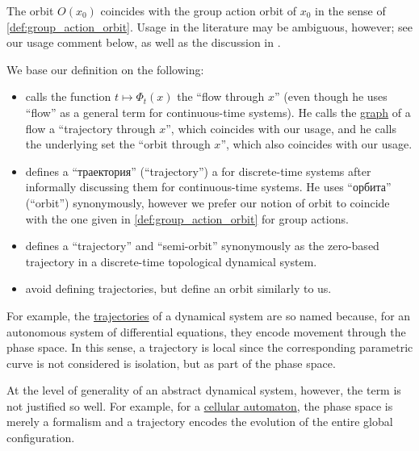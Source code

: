 \begin{comments}
  \item The orbit \( O(x_0) \) coincides with the group action orbit of \( x_0 \) in the sense of \cref{def:group_action_orbit}. Usage in the literature may be ambiguous, however; see our usage comment below, as well as the discussion in \cite{MathSE:orbit_and_trajectory_in_dynamical_system}.

  \item We base our definition on the following:
  \begin{itemize}
    \item {} calls the function \( t \mapsto \Phi_t(x) \) the \enquote{flow through \( x \)} (even though he uses \enquote{flow} as a general term for continuous-time systems). He calls the \hyperref[def:set_valued_map/graph]{graph} of a flow a \enquote{trajectory through \( x \)}, which coincides with our usage, and he calls the underlying set the \enquote{orbit through \( x \)}, which also coincides with our usage.

    \item {} defines a \enquote{траектория} (\enquote{trajectory}) a for discrete-time systems after informally discussing them for continuous-time systems. He uses \enquote{орбита} (\enquote{orbit}) synonymously, however we prefer our notion of orbit to coincide with the one given in \cref{def:group_action_orbit} for group actions.

    \item {} defines a \enquote{trajectory} and \enquote{semi-orbit} synonymously as the zero-based trajectory in a discrete-time topological dynamical system.

    \item {} avoid defining trajectories, but define an orbit similarly to us.
  \end{itemize}
\end{comments}

\begin{remark}\label{rem:dynamical_system_trajectory_terminology}
  For example, the \hyperref[def:dynamical_system_trajectory]{trajectories} of a dynamical system are so named because, for an autonomous system of differential equations, they encode movement through the phase space. In this sense, a trajectory is local since the corresponding parametric curve is not considered is isolation, but as part of the phase space.

  At the level of generality of an abstract dynamical system, however, the term is not justified so well. For example, for a \hyperref[def:cellular_automaton]{cellular automaton}, the phase space is merely a formalism and a trajectory encodes the evolution of the entire global configuration.
\end{remark}

